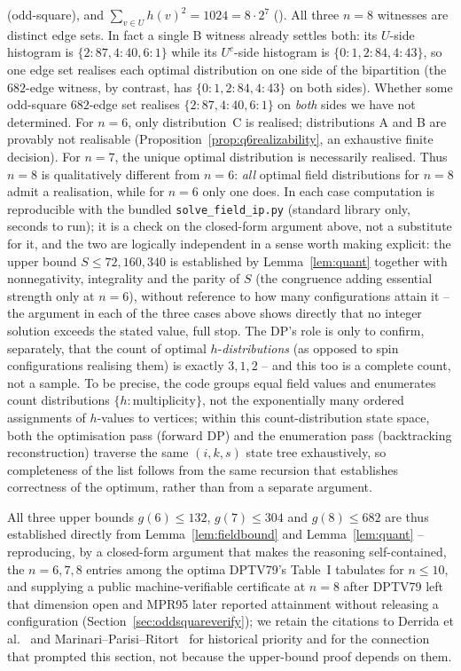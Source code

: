 \documentclass[12pt]{article}
\begin{document}
(odd-square), and $\sum_{v\in U}h(v)^2=1024=8\cdot2^7$ (\checkmark). All
three $n=8$ witnesses are distinct edge sets. In fact a single B witness
already settles both: its $U$-side histogram is $\{2{:}87,4{:}40,6{:}1\}$ while
its $U^{c}$-side histogram is $\{0{:}1,2{:}84,4{:}43\}$, so one edge set
realises each optimal distribution on one side of the bipartition (the
$682$-edge witness, by contrast, has $\{0{:}1,2{:}84,4{:}43\}$ on both sides).
Whether some odd-square $682$-edge set realises $\{2{:}87,4{:}40,6{:}1\}$ on
\emph{both} sides we have not determined.
For $n=6$, only distribution~C is realised;
distributions A and B are provably not realisable
(Proposition~\ref{prop:q6realizability}, an exhaustive finite decision).
For $n=7$, the unique optimal distribution is necessarily realised. Thus $n=8$
is qualitatively different from $n=6$: \emph{all} optimal field distributions
for $n=8$ admit a realisation, while for $n=6$ only one does. In each case
computation is reproducible with the bundled
\texttt{solve\_field\_ip.py} (standard library only, seconds to run);
it is a check on the closed-form argument above, not a substitute for
it, and the two are logically independent in a sense worth making
explicit: the upper bound $S\le72,160,340$ is established by
Lemma~\ref{lem:quant} together with nonnegativity, integrality and the
parity of $S$ (the congruence adding essential strength only at $n=6$),
without reference to how many configurations attain it -- the argument
in each of the three cases above shows directly that no integer
solution exceeds the stated value, full stop. The DP's role is only to
confirm, separately, that the count of optimal $h$-\emph{distributions}
(as opposed to spin configurations realising them) is exactly $3,1,2$
-- and this too is a complete count, not a sample. To be precise, the
code groups equal field values and enumerates count distributions
$\{h{:}\text{multiplicity}\}$, not the exponentially many ordered
assignments of $h$-values to vertices; within this count-distribution
state space, both the optimisation pass (forward DP) and the
enumeration pass (backtracking reconstruction) traverse the same
$(i,k,s)$ state tree exhaustively, so completeness of the list follows
from the same recursion that establishes correctness of the optimum,
rather than from a separate argument.

All three upper bounds $g(6)\le132$, $g(7)\le304$ and $g(8)\le682$ are thus established
directly from Lemma~\ref{lem:fieldbound} and Lemma~\ref{lem:quant} --
reproducing, by a closed-form argument that makes the reasoning self-contained, the
$n=6,7,8$ entries among the optima DPTV79's Table~I tabulates for
$n\le10$, and supplying
a public machine-verifiable certificate at $n=8$ after DPTV79 left that
dimension open and MPR95 later reported attainment without releasing a
configuration (Section~\ref{sec:oddsquareverify}); we retain the citations to
Derrida et al.~\cite{DPTV79} and Marinari--Parisi--Ritort~\cite{MPR95}
for historical priority and for the connection that prompted this
section, not because the upper-bound
proof depends on them.
\end{document}
